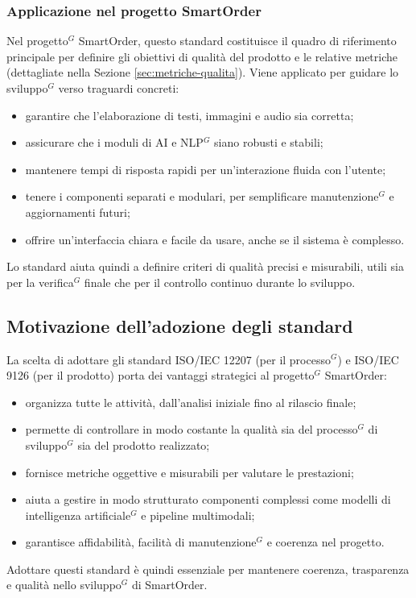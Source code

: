 \subsubsection{Applicazione nel progetto SmartOrder}
Nel progetto$^G$ SmartOrder, questo standard costituisce il quadro di riferimento principale per definire gli obiettivi di qualità del prodotto e le relative metriche (dettagliate nella Sezione \ref{sec:metriche-qualita}). Viene applicato per guidare lo sviluppo$^G$ verso traguardi concreti:
\begin{itemize}
    \setlength\itemsep{-0.1em}
    \item garantire che l'elaborazione di testi, immagini e audio sia corretta;
    \item assicurare che i moduli di AI e NLP$^G$ siano robusti e stabili;
    \item mantenere tempi di risposta rapidi per un'interazione fluida con l'utente;
    \item tenere i componenti separati e modulari, per semplificare manutenzione$^G$ e aggiornamenti futuri;
    \item offrire un'interfaccia chiara e facile da usare, anche se il sistema è complesso.
\end{itemize}
Lo standard aiuta quindi a definire criteri di qualità precisi e misurabili, utili sia per la verifica$^G$ finale che per il controllo continuo durante lo sviluppo.

\subsection{Motivazione dell’adozione degli standard}
La scelta di adottare gli standard ISO/IEC 12207 (per il processo$^G$) e ISO/IEC 9126 (per il prodotto) porta dei vantaggi strategici al progetto$^G$ SmartOrder:
\begin{itemize}
    \setlength\itemsep{-0.1em}
    \item organizza tutte le attività, dall'analisi iniziale fino al rilascio finale;
    \item permette di controllare in modo costante la qualità sia del processo$^G$ di sviluppo$^G$ sia del prodotto realizzato;
    \item fornisce metriche oggettive e misurabili per valutare le prestazioni;
    \item aiuta a gestire in modo strutturato componenti complessi come modelli di intelligenza artificiale$^G$ e pipeline multimodali;
    \item garantisce affidabilità, facilità di manutenzione$^G$ e coerenza nel progetto.
\end{itemize}
Adottare questi standard è quindi essenziale per mantenere coerenza, trasparenza e qualità nello sviluppo$^G$ di SmartOrder.